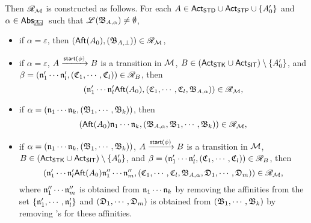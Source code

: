 Then $\mathscr{R}_{\mathcal{M} }$ is constructed as follows. 
For each $A \in {\sf Act}_{\sf STD} \cup {\sf Act}_{\sf STP} \cup \{A'_0\}$ and $\alpha \in \abs_{\mhcancel{A_0}}$ such that ${\mathscr{L} }({\mathfrak{B} }_{A, \alpha}) \neq \emptyset$,
\begin{itemize}
    \item if $\alpha = \varepsilon$, then $({\sf Aft}(A_0), ({\mathfrak{B} }_{A, \bot})) \in \mathscr{R}_{\mathcal{M} }$,
    \item if $\alpha = \varepsilon$, $A \xrightarrow{{\mathsf{start} }(\phi)} B$ is a transition in ${\mathcal{M} }$, $B \in ({\sf Act}_{\sf STK} \cup {\sf Act}_{\sf SIT}) \setminus \{A'_0\}$,  and $\beta = (\mathfrak{n}'_1 \cdots  \mathfrak{n}'_l, ({\mathfrak{C} }_1, \cdots, {\mathfrak{C} }_l)) \in \mathscr{R}_B$, then 
    $$(\mathfrak{n}'_1 \cdots  \mathfrak{n}'_l {\sf Aft}(A_0), ({\mathfrak{C} }_1, \cdots, {\mathfrak{C} }_l, {\mathfrak{B} }_{A, \alpha})) \in \mathscr{R}_{\mathcal{M} },$$  
    \item if $\alpha = (\mathfrak{n}_1 \cdots \mathfrak{n}_k, ({\mathfrak{B} }_1, \cdots, {\mathfrak{B} }_k))$, then 
    $$({\sf Aft}(A_0)\mathfrak{n}_1 \cdots \mathfrak{n}_k, ({\mathfrak{B} }_{A, \alpha}, {\mathfrak{B} }_1, \cdots, {\mathfrak{B} }_k)) \in \mathscr{R}_{\mathcal{M} },$$
    \item if $\alpha = (\mathfrak{n}_1 \cdots \mathfrak{n}_k, ({\mathfrak{B} }_1,\cdots,{\mathfrak{B} }_k))$, $A \xrightarrow{{\mathsf{start} }(\phi)} B$ is a transition in ${\mathcal{M} }$, $B \in ({\sf Act}_{\sf STK} \cup {\sf Act}_{\sf SIT}) \setminus \{A'_0\}$,  and $\beta = (\mathfrak{n}'_1 \cdots  \mathfrak{n}'_l, ({\mathfrak{C} }_1, \cdots, {\mathfrak{C} }_l)) \in \mathscr{R}_B$, then 
    $$(\mathfrak{n}'_1 \cdots  \mathfrak{n}'_l {\sf Aft}(A_0) \mathfrak{n}''_1 \cdots \mathfrak{n}''_m, ({\mathfrak{C} }_1, \cdots, {\mathfrak{C} }_l, {\mathfrak{B} }_{A, \alpha}, {\mathfrak{D} }_1, \cdots, {\mathfrak{D} }_m)) \in \mathscr{R}_{\mathcal{M} },$$ 
    where $\mathfrak{n}''_1 \cdots \mathfrak{n}''_m$ is obtained from $\mathfrak{n}_1 \cdots \mathfrak{n}_k$ by removing the affinities from the set $\{\mathfrak{n}'_1, \cdots, \mathfrak{n}'_l\}$ and $({\mathfrak{D} }_1, \cdots, {\mathfrak{D} }_m)$ is obtained from $({\mathfrak{B} }_1, \cdots, {\mathfrak{B} }_k)$ by removing {\WOTrNFA}'s for these affinities.  
\end{itemize}


